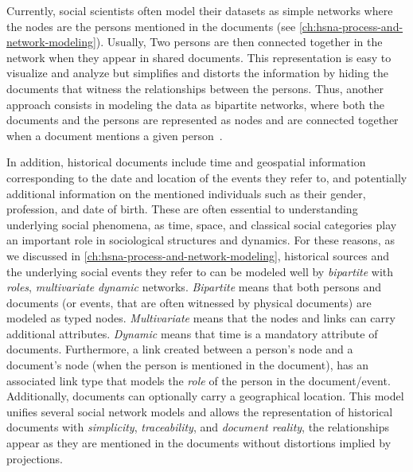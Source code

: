 Currently, social scientists often model their datasets as simple networks where the nodes are the persons mentioned in the documents (see \autoref{ch:hsna-process-and-network-modeling}).
Usually, Two persons are then connected together in the network when they appear in shared documents.
This representation is easy to visualize and analyze but simplifies and distorts the information by hiding the documents that witness the relationships between the persons.
Thus, another approach consists in modeling the data as bipartite networks, where both the documents and the persons are represented as nodes and are connected together when a document mentions a given person~\cite{grandjeanAnalisiVisualizzazioniReti2017, rossiExplorationLargeDatabase2014, shafieHypergraphRepresentationsStudy2017}.

In addition, historical documents include time and geospatial information corresponding to the date and location of the events they refer to, and potentially additional information on the mentioned individuals such as their gender, profession, and date of birth.
These are often essential to understanding underlying social phenomena, as time, space, and classical social categories play an important role in sociological structures and dynamics\cite{lemercier12FormalNetwork2015}.
For these reasons, as we discussed in \autoref{ch:hsna-process-and-network-modeling}, historical sources and the underlying social events they refer to can be modeled well by \emph{bipartite} with \emph{roles},  \emph{multivariate} \emph{dynamic} networks. \emph{Bipartite} means that both persons and documents (or events, that are often witnessed by physical documents) are modeled as typed nodes. \emph{Multivariate} means that the nodes and links can carry additional attributes. \emph{Dynamic} means that time is a mandatory attribute of documents.
Furthermore, a link created between a person's node and a document's node (when the person is mentioned in the document), has an associated link type that models the \emph{role} of the person in the document/event.
Additionally, documents can optionally carry a geographical location.
This model unifies several social network models and allows the representation of historical documents with \emph{simplicity}, \emph{traceability}, and \emph{document reality}, \ie the relationships appear as they are mentioned in the documents without distortions implied by projections\cite{cristofoliAuxSourcesGrands2008}.


